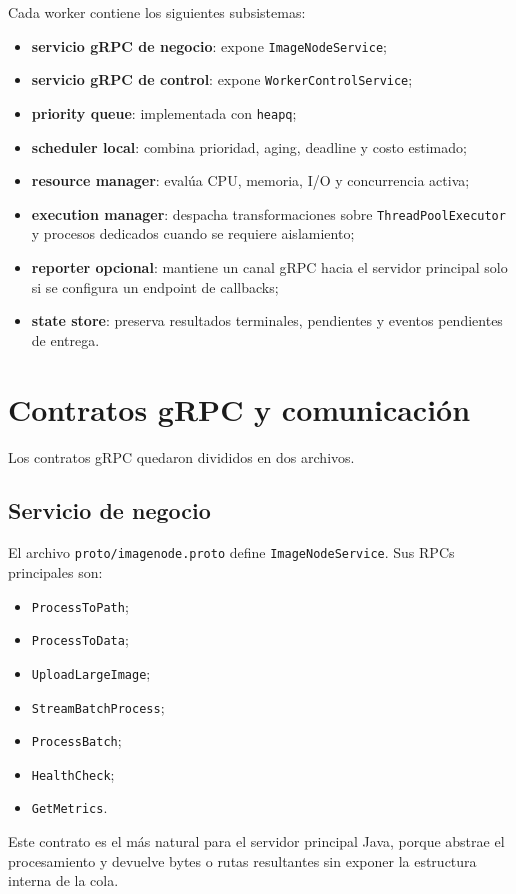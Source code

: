 \documentclass[conference]{IEEEtran}
\begin{document}
Cada worker contiene los siguientes subsistemas:
\begin{itemize}[leftmargin=*]
\item \textbf{servicio gRPC de negocio}: expone \texttt{ImageNodeService};
\item \textbf{servicio gRPC de control}: expone \texttt{WorkerControlService};
\item \textbf{priority queue}: implementada con \texttt{heapq};
\item \textbf{scheduler local}: combina prioridad, aging, deadline y costo estimado;
\item \textbf{resource manager}: evalúa CPU, memoria, I/O y concurrencia activa;
\item \textbf{execution manager}: despacha transformaciones sobre \texttt{ThreadPoolExecutor} y procesos dedicados cuando se requiere aislamiento;
\item \textbf{reporter opcional}: mantiene un canal gRPC hacia el servidor principal solo si se configura un endpoint de callbacks;
\item \textbf{state store}: preserva resultados terminales, pendientes y eventos pendientes de entrega.
\end{itemize}

\section{Contratos gRPC y comunicación}
Los contratos gRPC quedaron divididos en dos archivos.

\subsection{Servicio de negocio}
El archivo \texttt{proto/imagenode.proto} define \texttt{ImageNodeService}. Sus RPCs principales son:
\begin{itemize}[leftmargin=*]
\item \texttt{ProcessToPath};
\item \texttt{ProcessToData};
\item \texttt{UploadLargeImage};
\item \texttt{StreamBatchProcess};
\item \texttt{ProcessBatch};
\item \texttt{HealthCheck};
\item \texttt{GetMetrics}.
\end{itemize}

Este contrato es el más natural para el servidor principal Java, porque abstrae el procesamiento y devuelve bytes o rutas resultantes sin exponer la estructura interna de la cola.
\end{document}
